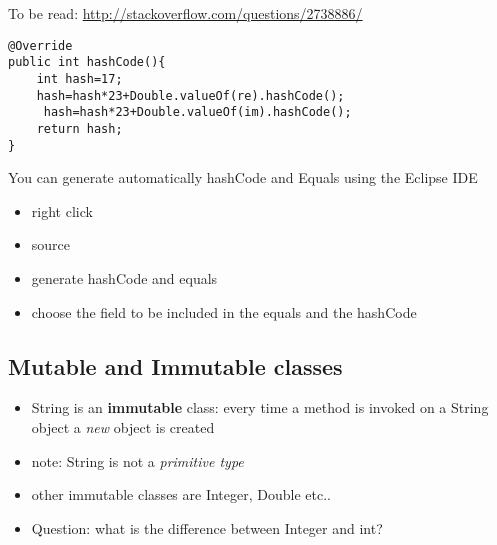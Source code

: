 \documentclass{article}
\begin{document}
To be read: \url{http://stackoverflow.com/questions/2738886/}

\begin{lstlisting}
@Override
public int hashCode(){
    int hash=17;
    hash=hash*23+Double.valueOf(re).hashCode();
     hash=hash*23+Double.valueOf(im).hashCode();
    return hash;
}
\end{lstlisting}

You can generate automatically hashCode and Equals using the Eclipse IDE
\begin{itemize}
\item right click
\item source
\item generate hashCode and equals
\item choose the field to be included in the equals and the hashCode
\end{itemize}

\subsection{Mutable and Immutable classes }
\begin{itemize}
\item String is an \textbf{immutable} class: every time a method is invoked on a String object a \emph{new} object is created
\item note: String is not a \emph{primitive type}
\item other immutable classes are Integer, Double etc..
\item Question: what is the difference between Integer and int?
\end{itemize}
\end{document}
